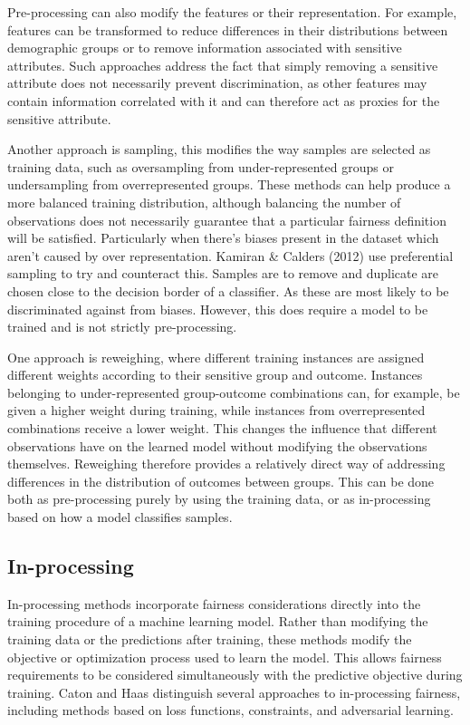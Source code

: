 Pre-processing can also modify the features or their representation. For example, features can be transformed to reduce differences in their distributions between demographic groups or to remove information associated with sensitive attributes. Such approaches address the fact that simply removing a sensitive attribute does not necessarily prevent discrimination, as other features may contain information correlated with it and can therefore act as proxies for the sensitive attribute.

Another approach is sampling, this modifies the way samples are selected as training data, such as oversampling from under-represented groups or undersampling from overrepresented groups. These methods can help produce a more balanced training distribution, although balancing the number of observations does not necessarily guarantee that a particular fairness definition will be satisfied. Particularly when there's biases present in the dataset which aren't caused by over representation. Kamiran \& Calders (2012) \cite{prefsample} use preferential sampling to try and counteract this. Samples are to remove and duplicate are chosen close to the decision border of a classifier. As these are most likely to be discriminated against from biases. However, this does require a model to be trained and is not strictly pre-processing.

One approach is reweighing, where different training instances are assigned different weights according to their sensitive group and outcome. Instances belonging to under-represented group-outcome combinations can, for example, be given a higher weight during training, while instances from overrepresented combinations receive a lower weight. This changes the influence that different observations have on the learned model without modifying the observations themselves. Reweighing therefore provides a relatively direct way of addressing differences in the distribution of outcomes between groups. This can be done both as pre-processing purely by using the training data, or as in-processing based on how a model classifies samples.

\subsection{In-processing}
In-processing methods incorporate fairness considerations directly into the training procedure of a machine learning model. Rather than modifying the training data or the predictions after training, these methods modify the objective or optimization process used to learn the model. This allows fairness requirements to be considered simultaneously with the predictive objective during training. Caton and Haas \cite{catonHaas} distinguish several approaches to in-processing fairness, including methods based on loss functions, constraints, and adversarial learning.

